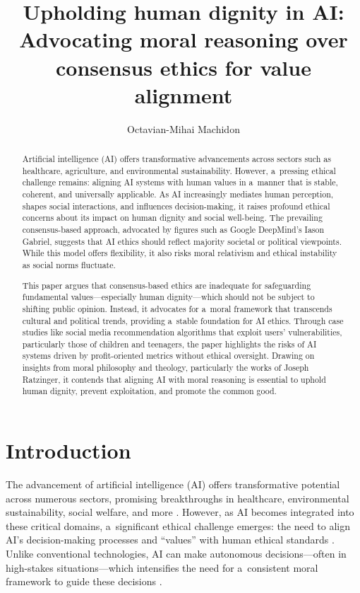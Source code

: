 \documentclass[%
  manuscript=article,
  year=2024,
  volume=77,
  doi=00000.000,
]{zfn}
\title[Upholding human dignity in AI\ldots]{Upholding human dignity in AI: Advocating moral reasoning over consensus ethics for value alignment}
\author{Octavian-Mihai Machidon}
\affiliation{University of Ljubljana}
\begin{document}
\begin{abstract}
Artificial intelligence (AI) offers transformative advancements across sectors such as healthcare, agriculture, and environmental sustainability. However, a~pressing ethical challenge remains: aligning AI systems with human values in a~manner that is stable, coherent, and universally applicable. As AI increasingly mediates human perception, shapes social interactions, and influences decision-making, it raises profound ethical concerns about its impact on human dignity and social well-being. The prevailing consensus-based approach, advocated by figures such as Google DeepMind's Iason Gabriel, suggests that AI ethics should reflect majority societal or political viewpoints. While this model offers flexibility, it also risks moral relativism and ethical instability as social norms fluctuate.

This paper argues that consensus-based ethics are inadequate for safeguarding fundamental values---especially human dignity---which should not be subject to shifting public opinion. Instead, it advocates for a~moral framework that transcends cultural and political trends, providing a~stable foundation for AI ethics. Through case studies like social media recommendation algorithms that exploit users' vulnerabilities, particularly those of children and teenagers, the paper highlights the risks of AI systems driven by profit-oriented metrics without ethical oversight. Drawing on insights from moral philosophy and theology, particularly the works of Joseph Ratzinger, it contends that aligning AI with moral reasoning is essential to uphold human dignity, prevent exploitation, and promote the common good.
\end{abstract}







\section{Introduction}

The advancement of artificial intelligence (AI) offers transformative potential across numerous sectors, promising breakthroughs in healthcare, environmental sustainability, social welfare, and more 
\parencites[][]{vinuesa_role_2020}[][]{topol_deep_2019}. %
 However, as AI becomes integrated into these critical domains, a~significant ethical challenge emerges: the need to align AI's decision-making processes and ``values'' with human ethical standards 
\parencite[][]{unesco_recommendation_2021}. %
 Unlike conventional technologies, AI can make autonomous decisions---often in high-stakes situations---which intensifies the need for a~consistent moral framework to guide these decisions 
\parencite[][]{floridi_unified_2019}.%
\end{document}
